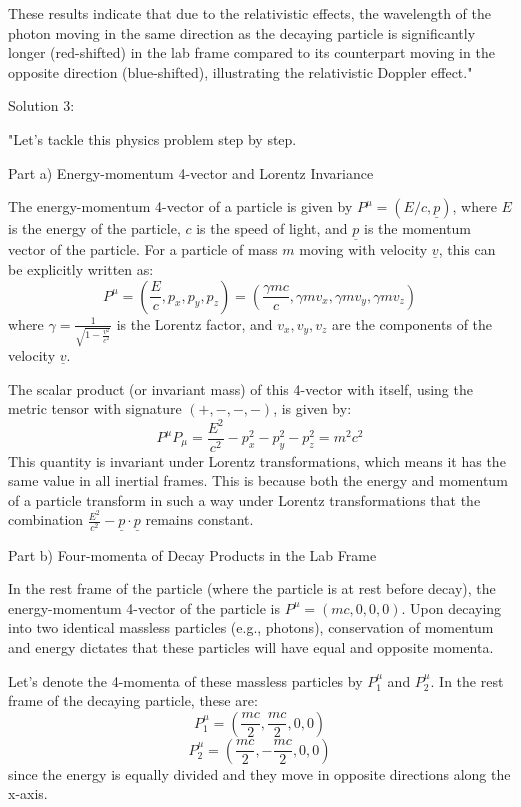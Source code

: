 These results indicate that due to the relativistic effects, the wavelength of the photon moving in the same direction as the decaying particle is significantly longer (red-shifted) in the lab frame compared to its counterpart moving in the opposite direction (blue-shifted), illustrating the relativistic Doppler effect."

Solution 3:

"Let's tackle this physics problem step by step.

Part a) Energy-momentum 4-vector and Lorentz Invariance

The energy-momentum 4-vector of a particle is given by \( P^\mu = (E/c, \underline{p}) \), where \( E \) is the energy of the particle, \( c \) is the speed of light, and \( \underline{p} \) is the momentum vector of the particle. For a particle of mass \( m \) moving with velocity \( \underline{v} \), this can be explicitly written as:
\[ P^\mu = \left(\frac{E}{c}, p_x, p_y, p_z\right) = \left(\frac{\gamma m c}{c}, \gamma m v_x, \gamma m v_y, \gamma m v_z\right) \]
where \( \gamma = \frac{1}{\sqrt{1 - \frac{v^2}{c^2}}} \) is the Lorentz factor, and \( v_x, v_y, v_z \) are the components of the velocity \( \underline{v} \).

The scalar product (or invariant mass) of this 4-vector with itself, using the metric tensor with signature \((+,-,-,-)\), is given by:
\[ P^\mu P_\mu = \frac{E^2}{c^2} - p_x^2 - p_y^2 - p_z^2 = m^2c^2 \]
This quantity is invariant under Lorentz transformations, which means it has the same value in all inertial frames. This is because both the energy and momentum of a particle transform in such a way under Lorentz transformations that the combination \( \frac{E^2}{c^2} - \underline{p} \cdot \underline{p} \) remains constant.

Part b) Four-momenta of Decay Products in the Lab Frame

In the rest frame of the particle (where the particle is at rest before decay), the energy-momentum 4-vector of the particle is \( P^\mu = (mc, 0, 0, 0) \). Upon decaying into two identical massless particles (e.g., photons), conservation of momentum and energy dictates that these particles will have equal and opposite momenta.

Let's denote the 4-momenta of these massless particles by \( P_1^\mu \) and \( P_2^\mu \). In the rest frame of the decaying particle, these are:
\[ P_1^\mu = \left(\frac{mc}{2}, \frac{mc}{2}, 0, 0\right) \]
\[ P_2^\mu = \left(\frac{mc}{2}, -\frac{mc}{2}, 0, 0\right) \]
since the energy is equally divided and they move in opposite directions along the x-axis.

